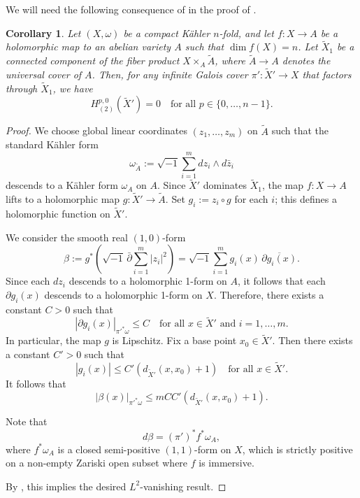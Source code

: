 \documentclass[11pt,a4paper,english]{smfart}
\theoremstyle{plain}
\newtheorem{corollary}[theorem]{Corollary}
\theoremstyle{definition}
\theoremstyle{plain}
\begin{document}
	\fi
	We will need the following consequence of  in the proof of . 
	\begin{corollary}\label{prop:abelian}
		Let \( (X, \omega) \) be a compact Kähler $n$-fold, and let \( f: X \to A \) be a holomorphic map to an abelian variety \( A \) such that \( \dim f(X) = n \). Let \( \widetilde{X}_1 \) be a connected component of the fiber product \( X \times_A \widetilde{A} \), where \( \widetilde{A} \to A \) denotes the universal cover of \( A \). Then, for any infinite Galois cover \( \pi':\widetilde{X}' \to X \) that factors through \( \widetilde{X}_1 \), we have
		\[
		H^{p,0}_{(2)}(\widetilde{X}') = 0 \quad \text{for all } p \in \{0, \ldots, n - 1\}.
		\]
		\end{corollary}
		
		\begin{proof}
	 We choose global linear coordinates \( (z_1, \ldots, z_m) \) on \( \widetilde{A} \) such that the standard Kähler form
		\[
		\omega_{\widetilde{A}} := \sqrt{-1} \sum_{i=1}^{m} dz_i \wedge d\bar{z}_i
		\]
		descends to a Kähler form \( \omega_A \) on \( A \). Since \( \widetilde{X}' \) dominates \( \widetilde{X}_1 \), the map \( f: X \to A \) lifts to a holomorphic map \( g: \widetilde{X}' \to \widetilde{A} \). 
		Set \( g_i := z_i \circ g \) for each \( i \); this defines a holomorphic function on \( \widetilde{X}' \).  
		
		We consider the smooth real \((1,0)\)-form
		\[
		\beta := g^*\left( \sqrt{-1} \, \bar{\partial} \sum_{i=1}^{m} |z_i|^2 \right) 
		= \sqrt{-1} \sum_{i=1}^{m} g_i(x) \, \overline{\partial g_i(x)}.
		\]
		Since each \( dz_i \) descends to a holomorphic 1-form on \( A \), it follows that each \( \partial g_i(x) \) descends to a holomorphic 1-form on \( X \). Therefore, there exists a constant \( C > 0 \) such that
		\[
		|\partial g_i(x)|_{\pi'^* \omega} \leq C
		\quad \text{for all } x \in \widetilde{X}' \text{ and } i = 1, \ldots, m.
		\]
		In particular, the map \( g \) is Lipschitz. Fix a base point \( x_0 \in \widetilde{X}' \). Then there exists a constant \( C' > 0 \) such that
		\[
		|g_i(x)| \leq C' \left( d_{\widetilde{X}'}(x, x_0) + 1 \right)
		\quad \text{for all } x \in \widetilde{X}'.
		\]
		It follows that
		\[
		|\beta(x)|_{\pi'^* \omega} \leq m C C' \left( d_{\widetilde{X}'}(x, x_0) + 1 \right).
		\]
		
		Note that
		\[
		d\beta = (\pi')^* f^* \omega_A,
		\]
		where \( f^* \omega_A \) is a closed semi-positive \((1,1)\)-form on \( X \), which is strictly positive on a non-empty Zariski open subset where \( f \) is immersive.
		
		By , this implies the desired \( L^2 \)-vanishing result.
	 	\end{proof}
	 
\end{document}
